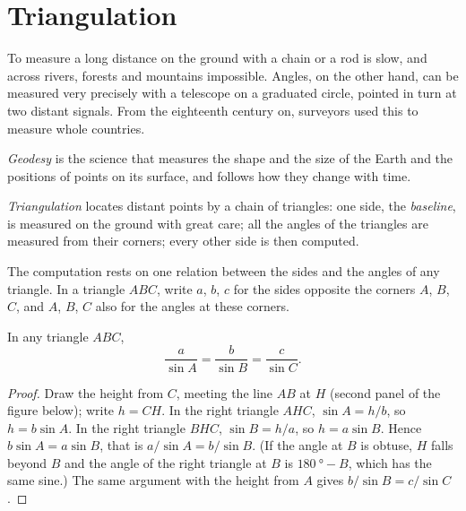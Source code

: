 \section{Triangulation}

To measure a long distance on the ground with a chain or a rod is slow, and
across rivers, forests and mountains impossible. Angles, on the other hand,
can be measured very precisely with a telescope on a graduated circle,
pointed in turn at two distant signals. From the eighteenth century on,
surveyors used this to measure whole countries.

\begin{definition}[Geodesy]\label{def:g10:measuring-the-earth:geodesy}
\emph{Geodesy} is the science that measures the shape and
the size of the Earth and the positions of points on its surface, and
follows how they change with time.
\end{definition}

\begin{definition}[Triangulation]\label{def:g10:measuring-the-earth:triangulation}
\emph{Triangulation} locates distant points by a chain
of triangles: one side, the \emph{baseline}, is measured on the ground with
great care; all the angles of the triangles are measured from their
corners; every other side is then computed.
\end{definition}

The computation rests on one relation between the sides and the angles of
any triangle. In a triangle $ABC$, write $a$, $b$, $c$ for the sides
opposite the corners $A$, $B$, $C$, and $A$, $B$, $C$ also for the angles at
these corners.

\begin{proposition}\label{prop:g10:measuring-the-earth:sine-rule}
In any triangle $ABC$,
\[
  \frac{a}{\sin A} = \frac{b}{\sin B} = \frac{c}{\sin C}.
\]
\end{proposition}

\begin{proof}
Draw the height from $C$, meeting the line $AB$ at $H$ (second panel of the
figure below); write $h = CH$. In the right triangle $AHC$, $\sin A = h/b$,
so $h = b \sin A$. In the right triangle $BHC$, $\sin B = h/a$, so
$h = a \sin B$. Hence $b \sin A = a \sin B$, that is $a/\sin A = b/\sin B$.
(If the angle at $B$ is obtuse, $H$ falls beyond $B$ and the angle of the
right triangle at $B$ is $\qty{180}{\degree} - B$, which has the same sine.)
The same argument with the height from $A$ gives $b/\sin B = c/\sin C$.
\end{proof}

